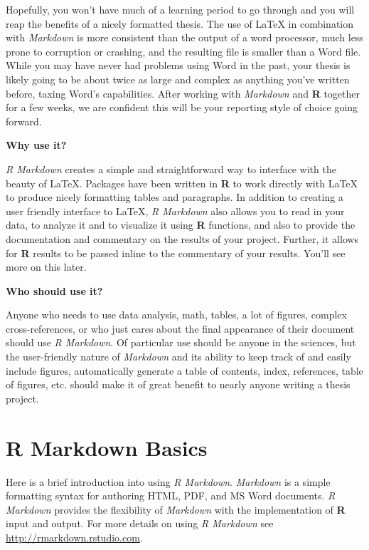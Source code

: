 \documentclass[12pt,twoside]{reedthesis}
\begin{document}
  Hopefully, you won't have much of a learning period to go through and
  you will reap the benefits of a nicely formatted thesis. The use of
  LaTeX in combination with \emph{Markdown} is more consistent than the
  output of a word processor, much less prone to corruption or crashing,
  and the resulting file is smaller than a Word file. While you may have
  never had problems using Word in the past, your thesis is likely going
  to be about twice as large and complex as anything you've written
  before, taxing Word's capabilities. After working with \emph{Markdown}
  and \textbf{R} together for a few weeks, we are confident this will be
  your reporting style of choice going forward.
  
  \textbf{Why use it?}
  
  \emph{R Markdown} creates a simple and straightforward way to interface
  with the beauty of LaTeX. Packages have been written in \textbf{R} to
  work directly with LaTeX to produce nicely formatting tables and
  paragraphs. In addition to creating a user friendly interface to LaTeX,
  \emph{R Markdown} also allows you to read in your data, to analyze it
  and to visualize it using \textbf{R} functions, and also to provide the
  documentation and commentary on the results of your project. Further, it
  allows for \textbf{R} results to be passed inline to the commentary of
  your results. You'll see more on this later.
  
  \textbf{Who should use it?}
  
  Anyone who needs to use data analysis, math, tables, a lot of figures,
  complex cross-references, or who just cares about the final appearance
  of their document should use \emph{R Markdown}. Of particular use should
  be anyone in the sciences, but the user-friendly nature of
  \emph{Markdown} and its ability to keep track of and easily include
  figures, automatically generate a table of contents, index, references,
  table of figures, etc. should make it of great benefit to nearly anyone
  writing a thesis project.
  
  \hypertarget{rmd-basics}{\chapter{R Markdown Basics}\label{rmd-basics}}
  
  Here is a brief introduction into using \emph{R Markdown}.
  \emph{Markdown} is a simple formatting syntax for authoring HTML, PDF,
  and MS Word documents. \emph{R Markdown} provides the flexibility of
  \emph{Markdown} with the implementation of \textbf{R} input and output.
  For more details on using \emph{R Markdown} see
  \url{http://rmarkdown.rstudio.com}.
  
\end{document}
